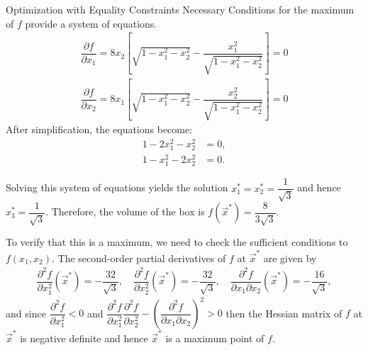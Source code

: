 \documentclass[
    NAME={Dr. Helga Ingimundardóttir},
    EMAIL={helgaingim@hi.is},
    FACULTY={Industrial Engineering},
    TITLE={Local and Global Optimization},
    SUBTITLE={Understanding Optima in Complex Landscapes},
    SEMINAR={VÉL113F},
    DATE={Design and Optimization},
    WIDE=true
]{../HI-latex/hi-beamer}
\begin{document}
\begin{frame}{Optimization with Equality Constraints}
        \alert{Necessary Conditions} for the maximum of \(f\) provide a system of equations.
        \begin{align*}
            \dfrac{\partial f}{\partial x_1} = 8x_2 \left[\sqrt{1-x_1^2-x_2^2}-
            \dfrac{x_1^2}{\sqrt{1-x_1^2-x_2^2}}\right] = 0\\
            \dfrac{\partial f}{\partial x_2} = 8x_1 \left[\sqrt{1-x_1^2-x_2^2}-
            \dfrac{x_2^2}{\sqrt{1-x_1^2-x_2^2}}\right] = 0
        \end{align*}
        After simplification, the equations become:
        \begin{align*}
            1-2x_1^2-x_2^2 &= 0, \\
            1-x_1^2-2x_2^2 &= 0.
        \end{align*}

        Solving this system of equations yields the solution $ x_1^* = x_2^* = \dfrac{1}{\sqrt{3}} $
        and hence $x_3^* = \dfrac{1}{\sqrt{3}} $.
        Therefore, the volume of the box is $f(\vec{x}^*) = \dfrac{8}{3\sqrt{3}}$.

        To verify that this is a maximum, we need to check the sufficient conditions to \( f(x_1,x_2)\).
        The second-order partial derivatives of $f$ at $\vec{x}^*$ are given by
        \begin{align*}
            \dfrac{\partial^2 f}{\partial x_1^2}(\vec{x}^*) = -\dfrac{32}{\sqrt{3}},\quad
            \dfrac{\partial^2 f}{\partial x_2^2}(\vec{x}^*) = -\dfrac{32}{\sqrt{3}},\quad
            \dfrac{\partial^2 f}{\partial x_1\partial x_2}(\vec{x}^*) = -\dfrac{16}{\sqrt{3}},
        \end{align*}
        and since $\dfrac{\partial^2 f}{\partial x_1^2}<0$ and $\dfrac{\partial^2 f}{\partial x_1^2}\dfrac{\partial^2
        f}{\partial x_2^2}-\left(\dfrac{\partial^2 f}{\partial x_1\partial x_2}\right)^2>0$ then the Hessian matrix of $f$ at
        $\vec{x}^*$ is negative definite and hence $\vec{x}^*$ is a maximum point of $f$.

    \end{frame}
\end{document}
